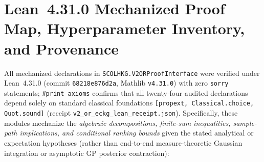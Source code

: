 \section{Lean~4.31.0 Mechanized Proof Map, Hyperparameter Inventory, and Provenance}\label{ec:lean_map}\label{ec:provenance}

All mechanized declarations in \texttt{SCOLHKG.V2ORProofInterface} were verified under Lean~4.31.0 (commit \texttt{68218e876d2a}, Mathlib \texttt{v4.31.0}) with zero \texttt{sorry} statements; \texttt{\#print axioms} confirms that all twenty-four audited declarations depend solely on standard classical foundations \texttt{[propext, Classical.choice, Quot.sound]} (receipt \texttt{v2\_or\_eckg\_lean\_receipt.json}). Specifically, these modules mechanize the \emph{algebraic decompositions, finite-sum inequalities, sample-path implications, and conditional ranking bounds} given the stated analytical or expectation hypotheses (rather than end-to-end measure-theoretic Gaussian integration or asymptotic GP posterior contraction):
